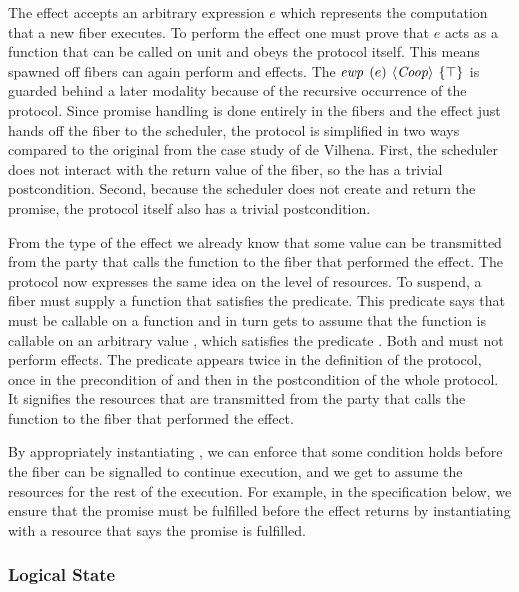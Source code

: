 The \efork{} effect accepts an arbitrary expression \(e\) which represents the computation that a new fiber executes.
To perform the effect one must prove that \(e\) acts as a function that can be called on unit and obeys the \proto{} protocol itself.
This means spawned off fibers can again perform \efork{} and \esuspend{} effects.
The \(\ewp{e}{\proto{}}{\top}\) is guarded behind a later modality because of the recursive occurrence of the \proto{} protocol.
Since promise handling is done entirely in the fibers and the \efork{} effect just hands off the fiber to the scheduler, the protocol is simplified in two ways compared to the original from the case study of de Vilhena.
First, the scheduler does not interact with the return value of the fiber, so the \ewpt{} has a trivial postcondition.
Second, because the scheduler does not create and return the promise, the protocol itself also has a trivial postcondition.

From the type of the \esuspend{} effect we already know that some value can be transmitted from the party that calls the  function to the fiber that performed the effect.
The \esuspend{} protocol now expresses the same idea on the level of resources.
To suspend, a fiber must supply a function  that satisfies the \gsIsReg{} predicate.
This predicate says that  must be callable on a  function and in turn gets to assume that the  function is callable on an arbitrary value , which satisfies the predicate .
Both  and  must not perform effects.
The predicate  appears twice in the definition of the protocol, once in the precondition of  and then in the postcondition of the whole protocol.
It signifies the resources that are transmitted from the party that calls the  function to the fiber that performed the effect.

By appropriately instantiating , we can enforce that some condition holds before the fiber can be signalled to continue execution, and we get to assume the resources  for the rest of the execution.
For example, in the  specification below, we ensure that the promise must be fulfilled before the effect returns by instantiating  with a resource that says the promise is fulfilled.

\subsubsection{Logical State}
\label{sec:sched-spec-state}

